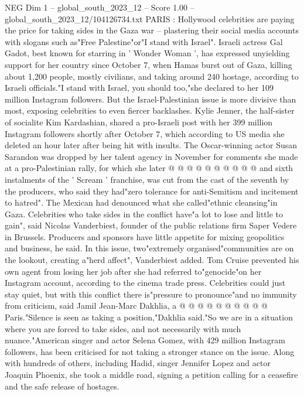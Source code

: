 \begin{textsample}{NEG Dim 1 – global\_south\_2023\_12 – Score 1.00 – global\_south\_2023\_12/104126734.txt}  \label{ex:f1_neg_409}
PARIS : Hollywood celebrities are paying the price for taking sides in the Gaza war -- plastering their social media accounts with slogans such as"Free Palestine"or"I stand with Israel".
Israeli actress Gal Gadot, best known for starring in ' Wonder Woman ', has expressed unyielding support for her country since October 7, when Hamas burst out of Gaza, killing about 1,200 people, mostly civilians, and taking around 240 hostage, according to Israeli officials."I stand with Israel, you should too,"she declared to her 109 million Instagram followers.
But the Israel-Palestinian issue is more divisive than most, exposing celebrities to even fiercer backlashes.
Kylie Jenner, the half-sister of socialite Kim Kardashian, shared a pro-Israeli post with her 399 million Instagram followers shortly after October 7, which according to US media she deleted an hour later after being hit with insults.
The Oscar-winning actor Susan Sarandon was dropped by her talent agency in November for comments she made at a pro-Palestinian rally, for which she later @ @ @ @ @ @ @ @ @ @ and sixth instalments of the ' Scream ' franchise, was cut from the cast of the seventh by the producers, who said they had"zero tolerance for anti-Semitism and incitement to hatred".
The Mexican had denounced what she called"ethnic cleansing"in Gaza.
Celebrities who take sides in the conflict have"a lot to lose and little to gain", said Nicolas Vanderbiest, founder of the public relations firm Saper Vedere in Brussels.
Producers and sponsors have little appetite for mixing geopolitics and business, he said.
In this issue, two"extremely organised"communities are on the lookout, creating a"herd affect", Vanderbiest added.
Tom Cruise prevented his own agent from losing her job after she had referred to"genocide"on her Instagram account, according to the cinema trade press.
Celebrities could just stay quiet, but with this conflict there is"pressure to pronounce"and no immunity from criticism, said Jamil Jean-Marc Dakhlia, a @ @ @ @ @ @ @ @ @ @ Paris."Silence is seen as taking a position,"Dakhlia said."So we are in a situation where you are forced to take sides, and not necessarily with much nuance."American singer and actor Selena Gomez, with 429 million Instagram followers, has been criticised for not taking a stronger stance on the issue.
Along with hundreds of others, including Hadid, singer Jennifer Lopez and actor Joaquin Phoenix, she took a middle road, signing a petition calling for a ceasefire and the safe release of hostages.

\end{textsample}
